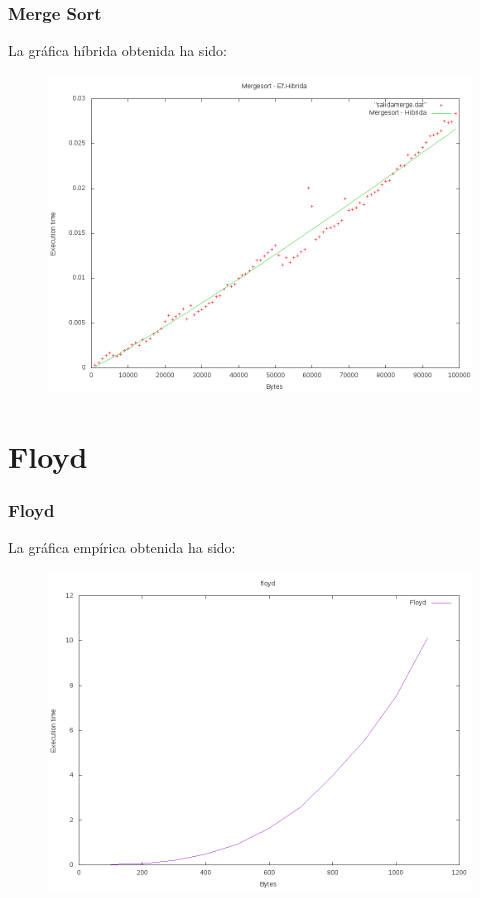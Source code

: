 \documentclass{beamer}
\begin{document}
\begin{frame}
	\frametitle{Merge Sort}
	La gráfica híbrida obtenida ha sido:
	\begin{figure}
		\centering
		\includegraphics[width=0.7\linewidth]{imagenes/mergesort-hibrida.png}
		\caption{}
		\label{fig:E5}
	\end{figure}
\end{frame}
\section{Floyd}
\begin{frame}
	\frametitle{Floyd}
	La gráfica empírica obtenida ha sido:
	\begin{figure}
		\centering
		\includegraphics[width=0.7\linewidth]{imagenes/floyd.png}
		\caption{}
		\label{fig:E4}
	\end{figure}
	
\end{frame}
\end{document}
